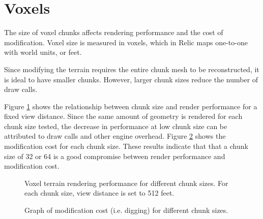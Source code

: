 \section{Voxels} \label{sec:results_voxels}

The size of voxel chunks affects rendering performance and the cost of modification.
Voxel size is measured in voxels, which in Relic maps one-to-one with world units, or feet.

Since modifying the terrain requires the entire chunk mesh to be reconstructed, it is ideal to have smaller chunks.
However, larger chunk sizes reduce the number of draw calls.

Figure \ref{fig:voxel_plot_1} shows the relationship between chunk size and render performance for a fixed view distance.
Since the same amount of geometry is rendered for each chunk size tested, the decrease in performance at low chunk size can be attributed to draw calls and other engine overhead.
Figure \ref{fig:voxel_plot_2} shows the modification cost for each chunk size.
These results indicate that that a chunk size of 32 or 64 is a good compromise between render performance and modification cost.

\begin{figure}
	\centering
{}
	\caption{
		Voxel terrain rendering performance for different chunk sizes.
		For each chunk size, view distance is set to 512 feet.
	}
	\label{fig:voxel_plot_1}
\end{figure}

\begin{figure}
	\centering
{}
	\caption{
		Graph of modification cost (i.e. digging) for different chunk sizes.
	}
	\label{fig:voxel_plot_2}
\end{figure}

